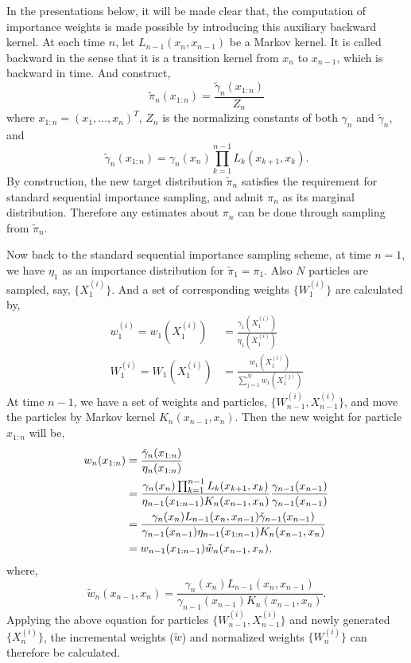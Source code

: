 In the presentations below, it will be made clear that, the computation of
importance weights is made possible by introducing this auxiliary backward
kernel. At each time $n$, let $L_{n-1}(x_n,x_{n-1})$ be a Markov kernel. It
is called backward in the sense that it is a transition kernel from $x_n$ to
$x_{n-1}$, which is backward in time. And construct,
\begin{equation}
  \tilde{\pi}_n(x_{1:n}) = \frac{\tilde{\gamma}_n(x_{1:n})}{Z_n}
\end{equation}
where $x_{1:n} = (x_1,\dots,x_n)^T$, $Z_n$ is the normalizing constants of
both $\gamma_n$ and $\tilde{\gamma}_n$, and
\begin{equation}
  \tilde{\gamma}_n(x_{1:n}) = \gamma_n(x_n)
  \prod_{k=1}^{n-1}L_k(x_{k+1},x_k).
\end{equation}
By construction, the new target distribution $\tilde{\pi}_n$ satisfies the
requirement for standard sequential importance sampling, and admit $\pi_n$
as its marginal distribution. Therefore any estimates about $\pi_n$ can be
done through sampling from $\tilde{\pi}_n$.

Now back to the standard sequential importance sampling scheme, at time
$n=1$, we have $\eta_1$ as an importance distribution for $\tilde{\pi}_1 =
\pi_1$. Also $N$ particles are sampled, say, $\{X_1^{(i)}\}$. And a set of
corresponding weights $\{W_1^{(i)}\}$ are calculated by,
\begin{align}
  w_1^{(i)} =
  w_1(X_1^{(i)}) &= \frac{\gamma_1(X_1^{(i)})}{\eta_1(X_1^{(i)})}
  \label{eq:ini_weight}\\
  W_1^{(i)} =
  W_1(X_1^{(i)}) &= \frac{w_1(X_1^{(i)})}{\sum_{j=1}^Nw_1(X_1^{(j)})}
  \label{eq:ini_weight_norm}
\end{align}
At time $n-1$, we have a set of weights and particles, $\{W_{n-1}^{(i)},
  X_{n-1}^{(i)}\}$, and move the particles by Markov kernel $K_n(x_{n-1},
x_n)$. Then the new weight for particle $x_{1:n}$ will be,
\begin{align}
  w_n(x_{1:n}) &= \frac{\tilde{\gamma}_n(x_{1:n})}{\eta_n(x_{1:n})}
  \allowdisplaybreaks\notag\\
  &= \frac{\gamma_n(x_n)\prod_{k=1}^{n-1}L_k(x_{k+1},x_k)}
  {\eta_{n-1}(x_{1:n-1})K_n(x_{n-1},x_n)}
  \frac{\gamma_{n-1}(x_{n-1})}{\gamma_{n-1}(x_{n-1})} \notag\\
  &= \frac{\gamma_n(x_n)L_{n-1}(x_n,x_{n-1})\tilde{\gamma}_{n-1}(x_{n-1})}
  {\gamma_{n-1}(x_{n-1})\eta_{n-1}(x_{1:n-1})K_n(x_{n-1},x_n)} \notag\\
  &= w_{n-1}(x_{1:n-1})\tilde{w}_n(x_{n-1},x_n),
\end{align}
where,
\begin{equation}
  \tilde{w}_n(x_{n-1},x_n) =
  \frac{\gamma_n(x_n)L_{n-1}(x_n,x_{n-1})}
  {\gamma_{n-1}(x_{n-1})K_n(x_{n-1},x_n)}.
  \label{eq:incr_weight}
\end{equation}
Applying the above equation for particles $\{W_{n-1}^{(i)}, X_{n-1}^{(i)}\}$
and newly generated $\{X_n^{(i)}\}$, the incremental weights ($\tilde{w}$)
and normalized weights $\{W_n^{(i)}\}$ can therefore be calculated.


